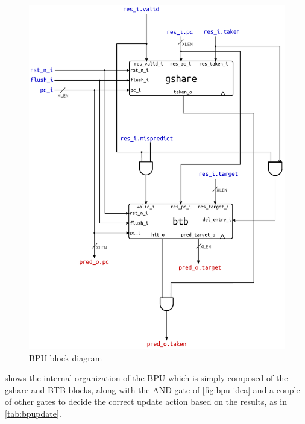 \begin{figure}[p]
  \centering
  \includegraphics[width=\textwidth]{img/bpu.pdf}
  \caption{\acs{BPU} block diagram}
  \label{fig:bpu}
\end{figure}
 shows the internal organization of the \ac{BPU} which is simply composed of the gshare and \ac{BTB} blocks, along with the AND gate of \cref{fig:bpu-idea} and a couple of other gates to decide the correct update action based on the results, as in \cref{tab:bpupdate}.

\pagebreak

